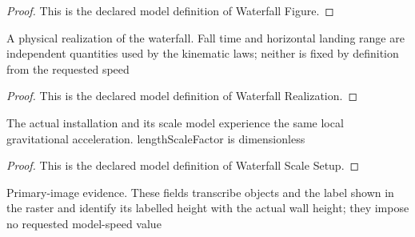\begin{proof}
  This is the declared model definition of Waterfall Figure.
\end{proof}
\begin{definition}
  \label{def:physics:phyx-mini-0684:phyxminiproblems-problemphyxmini0684-waterfallrealization}
  A physical realization of the waterfall. Fall time and horizontal landing range are independent quantities used by the kinematic laws; neither is fixed by definition from the requested speed
\end{definition}
\begin{proof}
  This is the declared model definition of Waterfall Realization.
\end{proof}
\begin{definition}
  \label{def:physics:phyx-mini-0684:phyxminiproblems-problemphyxmini0684-waterfallscalesetup}
  The actual installation and its scale model experience the same local gravitational acceleration. lengthScaleFactor is dimensionless
\end{definition}
\begin{proof}
  This is the declared model definition of Waterfall Scale Setup.
\end{proof}
\begin{definition}
  \label{def:physics:phyx-mini-0684:phyxminiproblems-problemphyxmini0684-matchesprimaryfigure}
  Primary-image evidence. These fields transcribe objects and the label shown in the raster and identify its labelled height with the actual wall height; they impose no requested model-speed value
\end{definition}
